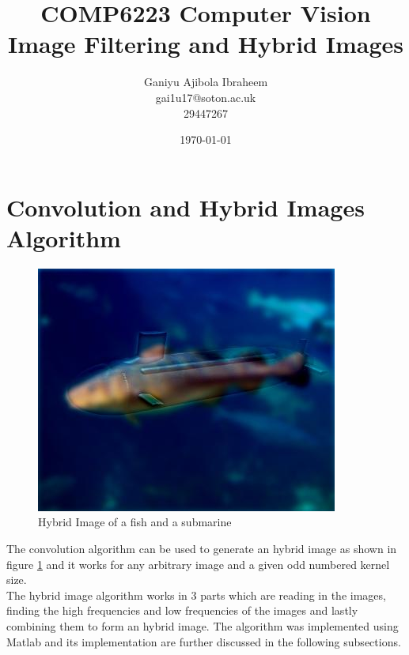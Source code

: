 \documentclass[a4paper,12pt]{article}
\begin{document}
	
\begin{titlepage}
	\title{
		COMP6223 Computer Vision \\
		\large Image Filtering and Hybrid Images
	}
	\date{\today}
	\author{
		Ganiyu Ajibola Ibraheem \\
		\large gai1u17@soton.ac.uk \\
			29447267
	}
\end{titlepage}

\maketitle
\newpage
{}
\tableofcontents
\newpage
\listoffigures
\listoftables
\listoflistings
\newpage
{}


\section{Convolution and Hybrid Images Algorithm}
\begin{figure}[h!]
	\centering
	\includegraphics[width=0.55\linewidth]{images/fish_submarine}
	\caption{Hybrid Image of a fish and a submarine}
	\label{fig:fish_submarine}
\end{figure}
The convolution algorithm can be used to generate an hybrid image as shown in figure \ref{fig:fish_submarine} and it works for any arbitrary image and a given odd numbered kernel size. \\

The hybrid image algorithm works in 3 parts which are reading in the images, finding the high frequencies and low frequencies of the images and lastly combining them to form an hybrid image. The algorithm was implemented using Matlab and its implementation are further discussed in the following subsections.
\end{document}
